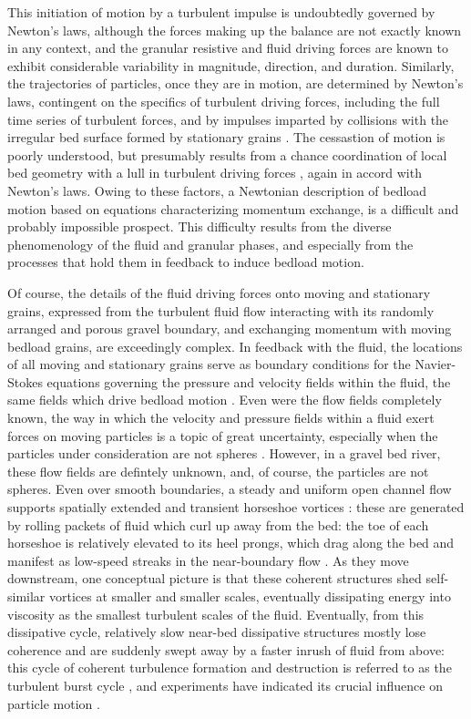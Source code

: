 \documentclass{article}
\begin{document}
This initiation of motion by a turbulent impulse is undoubtedly governed by Newton's laws, although the forces making up the balance are not exactly known in any context, and the granular resistive \citep{Lamb2008} and fluid driving \citep{Schmeeckle2007, Celik2014, Amir2014, Shih2017} forces are known to exhibit considerable variability in magnitude, direction, and duration. 
Similarly, the trajectories of particles, once they are in motion, are determined by Newton's laws, contingent on the specifics of turbulent driving forces, including the full time series of turbulent forces, and by impulses imparted by collisions with the irregular bed surface formed by stationary grains \citep{Wiberg1985, Bialik2015}. 
The cessastion of motion is poorly understood, but presumably results from a chance coordination of local bed geometry with a lull in turbulent driving forces \citep{Pahtz2018}, again in accord with Newton's laws.  
Owing to these factors, a Newtonian description of bedload motion based on equations characterizing momentum exchange, is a difficult and probably impossible prospect. 
This difficulty results from the diverse phenomenology of the fluid and granular phases, and especially from the processes that hold them in feedback to induce bedload motion. 

Of course, the details of the fluid driving forces onto moving and stationary grains, expressed from the turbulent fluid flow interacting with its randomly arranged and porous gravel boundary, and exchanging momentum with moving bedload grains, are exceedingly complex. 
In feedback with the fluid, the locations of all moving and stationary grains serve as boundary conditions for the Navier-Stokes equations governing the pressure and velocity fields within the fluid, the same fields which drive bedload motion \citep{Nikora2013}.
Even were the flow fields completely known, the way in which the velocity and pressure fields within a fluid exert forces on moving particles is a topic of great uncertainty, especially when the particles under consideration are not spheres \citep{Maxey1983}.
However, in a gravel bed river, these flow fields are defintely unknown, and, of course, the particles are not spheres.  
Even over smooth boundaries, a steady and uniform open channel flow supports spatially extended and transient horseshoe vortices \citep{Adrian2007}: these are generated by rolling packets of fluid which curl up away from the bed: the toe of each horseshoe is relatively elevated to its heel prongs, which drag along the bed and manifest as low-speed streaks in the near-boundary flow \citep{Klein1967, Nino1998}. 
As they move downstream, one conceptual picture is that these coherent structures shed self-similar vortices at smaller and smaller scales, eventually dissipating energy into viscosity as the smallest turbulent scales of the fluid. 
Eventually, from this dissipative cycle, relatively slow near-bed dissipative structures mostly lose coherence and are suddenly swept away by a faster inrush of fluid from above: this cycle of coherent turbulence formation and destruction is referred to as the turbulent burst cycle \citep{}, and experiments have indicated its crucial influence on particle motion \citep{Nino1998, Amir2017}. 
\end{document}
